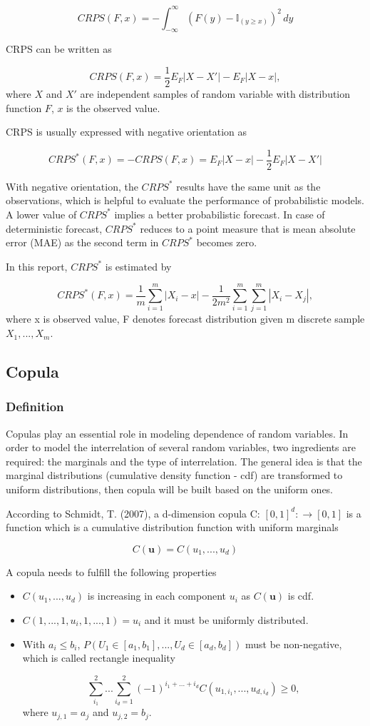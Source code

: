 \documentclass[12pt,a4paper]{article}
\numberwithin{equation}{section}
\begin{document}
 \[CRPS(F,x) = - \int_{-\infty}^{\infty}  (F(y) - \mathbb{I}_{(y \geq x)}) ^2 \,dy\]
 
 CRPS can be written as 
 
 \[CRPS(F, x) =  \frac{1}{2} E_F |X-X'| - E_F |X-x|,\]
 where $X$ and $X'$ are independent samples of random variable with distribution function $F$, $x$ is the observed value.
 
 CRPS is usually expressed with negative orientation as
 
 \[CRPS^*(F, x) = - CRPS(F, x) = E_F |X-x| - \frac{1}{2} E_F |X-X'|\]
 
 With negative orientation, the $CRPS^*$ results have the same unit as the observations, which is helpful to evaluate the performance of probabilistic models. A lower value of $CRPS^*$ implies a better probabilistic forecast. In case of deterministic forecast, $CRPS^*$ reduces to a point measure that is mean absolute error (MAE) as the second term in $CRPS^*$ becomes zero.
 
 In this report, $CRPS^*$ is estimated by
 
 \[ CRPS^*(F, x) = \frac{1}{m} \sum_{i = 1}^{m} | X_i - x | - \frac{1}{2m^2} \sum_{i = 1}^{m} \sum_{j = 1}^{m} | X_i - X_j |,\]
 where x is observed value, F denotes forecast distribution given m discrete sample $X_1, ..., X_m$.
 
 \subsection{Copula}
 \subsubsection{Definition}
 Copulas play an essential role in modeling dependence of random variables. In order to model the interrelation of several random variables, two ingredients are required: the marginals and the type of interrelation. The general idea is that the marginal distributions (cumulative density function - cdf) are transformed to uniform distributions, then copula will be built based on the uniform ones.
 
 According to Schmidt, T. (2007), a d-dimension copula C: $[0, 1]^d :\rightarrow [0,1]$ is a function which is a cumulative distribution function with uniform marginals
 
 \[C(\textbf{u}) = C(u_1, ..., u_d)\]
 
 A copula needs to fulfill the following properties
 
 \begin{itemize}
 \item $C( u_1, ..., u_d)$ is increasing in each component $u_i$ as $C(\textbf{u})$ is cdf.
 \item $C(1, ..., 1, u_i, 1,..., 1) = u_i$ and it must be uniformly distributed.
 \item With $a_i \leq b_i$, $P(U_1 \in [a_1, b_1], ..., U_d \in [a_d, b_d])$ must be non-negative, which is called rectangle inequality
 
\[\sum_{i_1}^{2}... \sum_{i_d=1}^{2}(-1)^{i_1 + ... + i_d} C(u_{1, i_1}, ..., u_{d, i_d}) \geq 0,\] 
where $u_{j,1} = a_j$ and $u_{j,2} = b_j$.
 \end{itemize}
\end{document}
